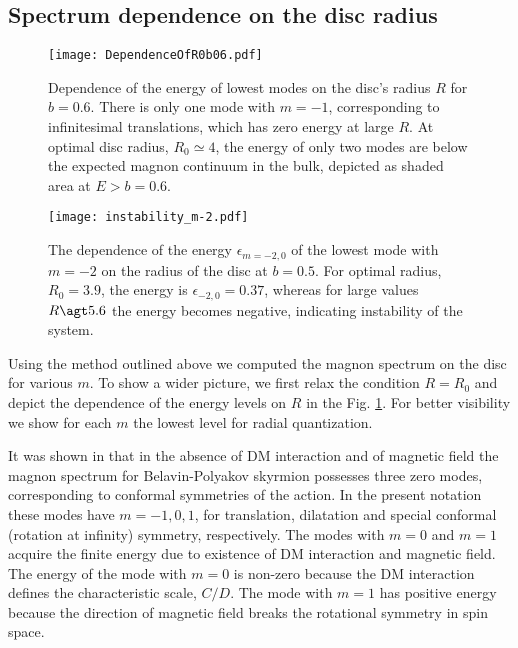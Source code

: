 \documentclass[aps,prb,twocolumn,superscriptaddress,nobalancelastpage]{revtex4-1}
\begin{document}
\subsection{Spectrum dependence  on the disc radius
\label{sec:spectrumRadius}}

\begin{figure}[t]
\texttt{[image: DependenceOfR0b06.pdf]}
\caption{Dependence of the energy of lowest modes on the disc's radius $R$ for $b=0.6$. There is only one  mode with $m=-1$, corresponding to infinitesimal translations, which has zero energy at large $R$. At optimal disc radius, $R_{0}\simeq 4$, the energy of only two modes are below the expected magnon continuum in the bulk, depicted as shaded area at $E>b = 0.6$.}
\label{pic:plotModeEnerg}
\end{figure}

\begin{figure}[t]
\texttt{[image: instability\_m-2.pdf]}
\caption{ The dependence of the energy $\epsilon_{m=-2,0}$ of the lowest  mode with $m=-2$ on the radius of the disc at $b=0.5$. For optimal radius, $R_{0}=3.9$, the energy is $\epsilon _{-2,0} =0.37$, whereas for large values $R\agt 5.6$ the energy becomes negative, indicating instability of the system\cite{Schutte2014,Ezawa2011}. }
\label{pic:instability}
\end{figure}


Using the method outlined above we computed the magnon spectrum on the disc for various $m$.  
To show a wider picture, we first relax the condition $R=R_{0}$ and depict the dependence of the energy levels on $R$ in the Fig. \ref{pic:plotModeEnerg}.
For better visibility we show for each $m$ the lowest level for radial quantization. 

It was shown in \cite{Aristov2015} that in the absence of DM interaction and of magnetic field the magnon spectrum for Belavin-Polyakov skyrmion possesses three zero modes, corresponding to conformal symmetries of the action. In the present notation these modes have $m=-1,0,1$, for translation, dilatation and special conformal (rotation at infinity) symmetry, respectively.  The modes with $m=0$ and $m=1$ acquire the finite energy due to existence of DM interaction and magnetic field.   The energy of the mode with  $m=0$ is non-zero because the DM interaction defines the characteristic scale, $C/D$. The mode with $m=1$ has positive energy because the direction of magnetic field breaks the rotational symmetry in spin space.
\end{document}
